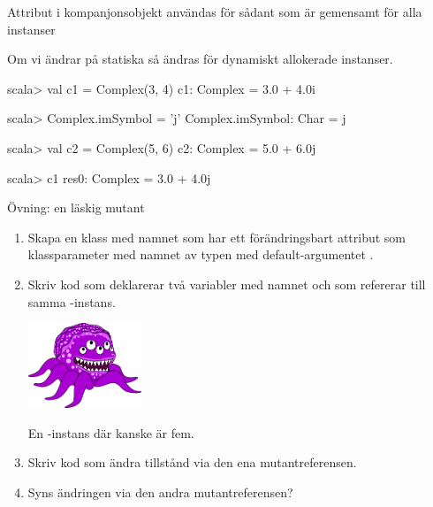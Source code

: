 \begin{Slide}{Attribut i kompanjonsobjekt användas för sådant som är gemensamt för alla instanser}

Om vi ändrar på statiska  så ändras  för  dynamiskt allokerade instanser.
\begin{REPLnonum}
scala> val c1 = Complex(3, 4)
c1: Complex = 3.0 + 4.0i

scala> Complex.imSymbol = 'j'
Complex.imSymbol: Char = j

scala> val c2 = Complex(5, 6)
c2: Complex = 5.0 + 6.0j

scala> c1
res0: Complex = 3.0 + 4.0j
\end{REPLnonum}
\end{Slide}


\begin{Slide}{Övning: en läskig mutant}\SlideFontSmall
\begin{enumerate}
\item Skapa en klass med namnet  som har ett förändringsbart attribut som klassparameter med namnet  av typen  med default-argumentet .
\vspace{0.5em}

\item \begin{minipage}{0.5\textwidth}
Skriv kod som deklarerar två variabler med namnet  och  som refererar till samma -instans.
\end{minipage}
\hfill\begin{minipage}{0.32\textwidth}
\hfill\includegraphics[width=3.4cm]{../img/mutant.png}

En -instans där  kanske är fem.
\vspace{1em}
\end{minipage}

\item Skriv kod som ändra tillstånd via den ena mutantreferensen.

\item Syns ändringen via den andra mutantreferensen?
\end{enumerate}
\end{Slide}


